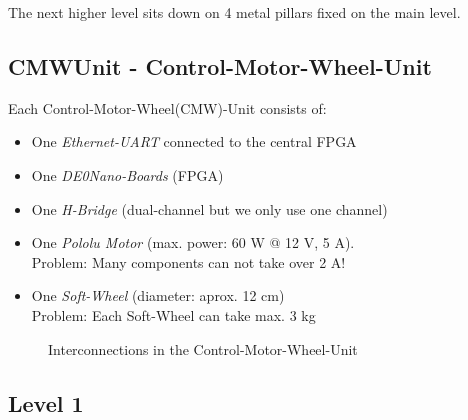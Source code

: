 The next higher level sits down on 4 metal pillars fixed on the main level. 

\subsection{CMWUnit - Control-Motor-Wheel-Unit}
	Each Control-Motor-Wheel(CMW)-Unit consists of:
	\begin{itemize}	
		\item One \textit{Ethernet-UART} connected to the central FPGA
	
		\item One \textit{DE0Nano-Boards} (FPGA)
		
		\item One \textit{H-Bridge}	(dual-channel but we only use one channel)
	
		\item One \textit{Pololu Motor} (max. power: 60 W @ 12 V, 5 A).\\
		Problem: Many components can not take over 2 A! 
		
		\item One \textit{Soft-Wheel} (diameter: aprox. 12 cm)\\
		Problem: Each Soft-Wheel can take max. 3 kg 
	\end{itemize}
	
\begin{figure}[ht] 
	\caption{Interconnections in the Control-Motor-Wheel-Unit} \label{CMWUnit}
\end{figure}

\subsection{Level 1}

